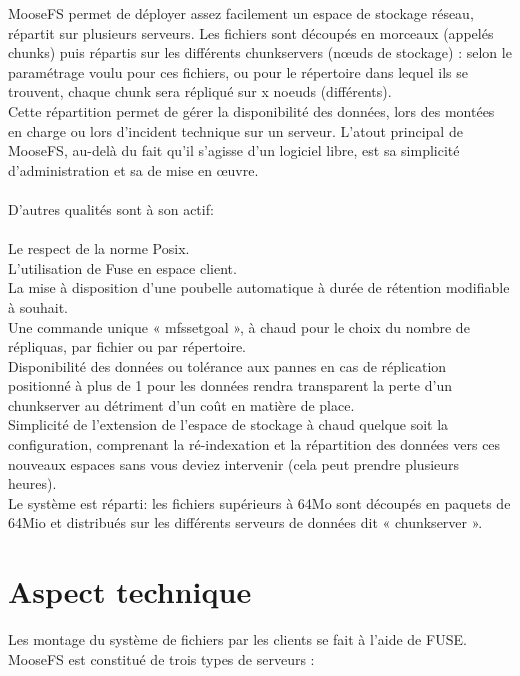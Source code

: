\documentclass[12pt]{report}
\begin{document}
			MooseFS permet de déployer assez facilement un espace de stockage réseau, répartit sur plusieurs serveurs. 
			Les fichiers sont découpés en morceaux (appelés chunks) puis répartis sur les différents chunkservers (nœuds de stockage) :
			selon le paramétrage voulu pour ces fichiers, ou pour le répertoire dans lequel ils se trouvent,
			chaque chunk sera répliqué sur x noeuds (différents).\\
			Cette répartition permet de gérer la disponibilité des données, lors des montées en charge ou lors d’incident technique
			sur un serveur. L'atout principal de MooseFS, au-delà du fait qu'il s’agisse d’un logiciel libre,
			est sa simplicité d'administration et sa de mise en œuvre.\\\\
			D'autres qualités sont à son actif: \\\\
			Le respect de la norme Posix.\\
			L'utilisation de Fuse en espace client.\\
			La mise à disposition d'une poubelle automatique à durée de rétention modifiable à souhait.\\
			Une commande unique « mfssetgoal », à chaud pour le choix du nombre de répliquas, par fichier ou par répertoire.\\
			Disponibilité des données ou tolérance aux pannes en cas de réplication positionné à plus de 1 pour les données
			rendra transparent la perte d'un chunkserver au détriment d'un coût en matière de place.\\ 
			Simplicité de l'extension de l'espace de stockage à chaud quelque soit la configuration,
			comprenant la ré-indexation et la répartition des données vers ces nouveaux espaces sans vous deviez intervenir
			(cela peut prendre plusieurs heures).  \\
			Le système est réparti: les fichiers supérieurs à 64Mo sont découpés en paquets de 64Mio et distribués
			sur les différents serveurs de données dit « chunkserver ».\\
			\section{Aspect technique}
				
				Les montage du système de fichiers par les clients se fait à l'aide de FUSE.
				MooseFS est constitué de trois types de serveurs :
\end{document}
